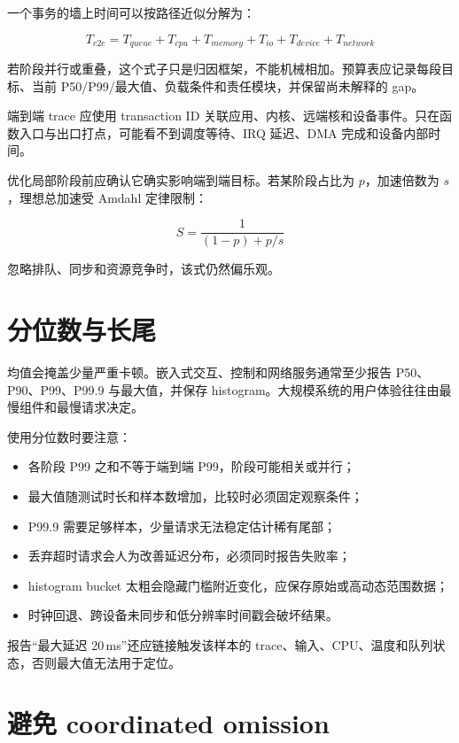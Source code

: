 一个事务的墙上时间可以按路径近似分解为：

\begin{equation}
  T_{e2e}=T_{queue}+T_{cpu}+T_{memory}+T_{io}+T_{device}+T_{network}
\end{equation}

若阶段并行或重叠，这个式子只是归因框架，不能机械相加。预算表应记录每段目标、当前 P50/P99/最大值、负载条件和责任模块，并保留尚未解释的 gap。

端到端 trace 应使用 transaction ID 关联应用、内核、远端核和设备事件。只在函数入口与出口打点，可能看不到调度等待、IRQ 延迟、DMA 完成和设备内部时间。

优化局部阶段前应确认它确实影响端到端目标。若某阶段占比为 $p$，加速倍数为 $s$，理想总加速受 Amdahl 定律限制：

\begin{equation}
  S=\frac{1}{(1-p)+p/s}
\end{equation}

忽略排队、同步和资源竞争时，该式仍然偏乐观。

\section{分位数与长尾}

均值会掩盖少量严重卡顿。嵌入式交互、控制和网络服务通常至少报告 P50、P90、P99、P99.9 与最大值，并保存 histogram。大规模系统的用户体验往往由最慢组件和最慢请求决定\cite{dean-barroso-tail-2013}。

使用分位数时要注意：

\begin{itemize}
  \item 各阶段 P99 之和不等于端到端 P99，阶段可能相关或并行；
  \item 最大值随测试时长和样本数增加，比较时必须固定观察条件；
  \item P99.9 需要足够样本，少量请求无法稳定估计稀有尾部；
  \item 丢弃超时请求会人为改善延迟分布，必须同时报告失败率；
  \item histogram bucket 太粗会隐藏门槛附近变化，应保存原始或高动态范围数据；
  \item 时钟回退、跨设备未同步和低分辨率时间戳会破坏结果。
\end{itemize}

报告“最大延迟 20\,ms”还应链接触发该样本的 trace、输入、CPU、温度和队列状态，否则最大值无法用于定位。

\section{避免 coordinated omission}

